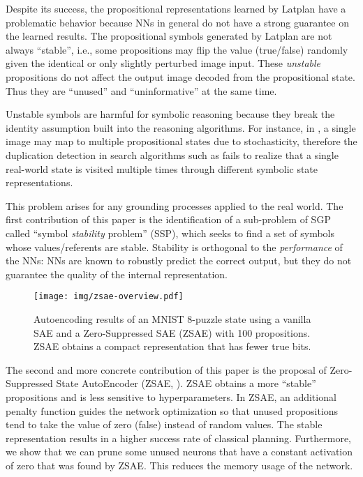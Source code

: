 Despite its success,
the propositional representations learned by Latplan have a problematic behavior
because NNs in general do not have a strong guarantee on the learned results.
The propositional symbols generated by Latplan are not always
``stable'', i.e., some propositions may flip the value (true/false) randomly
given the identical or only slightly perturbed image input.
These \emph{unstable} propositions do not affect the output image decoded from the propositional state.
Thus they are ``unused'' and ``uninformative'' at the same time.

Unstable symbols are harmful for symbolic reasoning because
they break the identity assumption built into the reasoning algorithms.
For instance, in \latentplanner, 
a single image may map to multiple propositional states due to stochasticity,
therefore the duplication detection in search algorithms such as \astar \cite{hart1968formal}
fails to realize that a single real-world state is visited multiple times through
different symbolic state representations.

This problem arises for any grounding processes applied to the real world.
The first contribution of this paper is the identification of a sub-problem of SGP
called ``symbol \emph{stability} problem'' (SSP), which seeks to find a set of symbols
whose values/referents are stable.
Stability is orthogonal to the \emph{performance} of the NNs:
NNs are known to robustly predict the correct output, but they do not guarantee
the quality of the internal representation.

\begin{figure}[tb]
 \centering
 \texttt{[image: img/zsae-overview.pdf]}
 \caption{
Autoencoding results of an MNIST 8-puzzle state
using a vanilla SAE \cite{Asai2018} and a Zero-Suppressed SAE (ZSAE) with 100 propositions.
ZSAE obtains a compact representation that has fewer true bits.}
 \label{zsae-overview}
\end{figure}

The second and more concrete contribution of this paper is
the proposal of Zero-Suppressed State AutoEncoder (ZSAE, ).
ZSAE obtains a more ``stable'' propositions and is less sensitive to hyperparameters.
In ZSAE, an additional penalty function
guides the network optimization so that unused propositions tend to 
take the value of zero (false) instead of random values.
The stable representation results in a higher success rate of classical planning.
Furthermore,
we show that we can prune some unused neurons
that have a constant activation of zero that was found by ZSAE.
This reduces the memory usage of the network.

